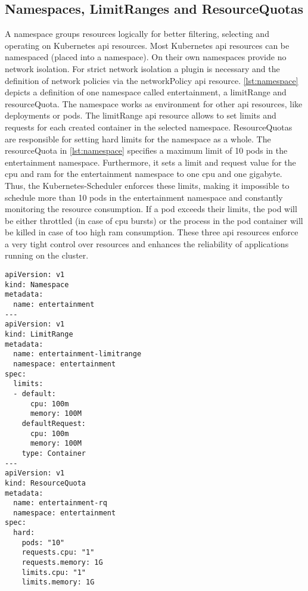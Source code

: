 \documentclass[titlepage]{report}
\begin{document}
\subsection{Namespaces, LimitRanges and ResourceQuotas}
A namespace groups resources logically for better filtering, selecting and operating on Kubernetes \gls{api} resources.
Most Kubernetes \gls{api} resources can be namespaced (placed into a namespace). On their own namespaces provide no network isolation.
For strict network isolation a  plugin is necessary and the definition of network policies via the networkPolicy \gls{api}
resource. \autoref{lst:namespace} depicts a definition of one namespace called entertainment, a limitRange and resourceQuota.
The namespace works as environment for other \gls{api} resources, like deployments or pods. The limitRange \gls{api} resource
allows to set limits and requests for each created container in the selected namespace. ResourceQuotas are responsible for
setting hard limits for the namespace as a whole. The resourceQuota in \autoref{lst:namespace} specifies a maximum limit
of 10 pods in the entertainment namespace. Furthermore, it sets a limit and request value for the \gls{cpu} and \gls{ram} for
the entertainment namespace to one \gls{cpu} and one gigabyte. Thus, the Kubernetes-Scheduler enforces these limits, making it impossible
to schedule more than 10 pods in the entertainment namespace and constantly monitoring the resource consumption. If a pod exceeds their
limits, the pod will be either throttled (in case of \gls{cpu} bursts) or the process in the pod container will be killed {in case of too high \gls{ram} consumption}.
These three \gls{api} resources enforce a very tight control over resources and enhances the reliability of applications running on the cluster.

\begin{minipage}{\linewidth}
\begin{lstlisting}[caption={Namespace definition for a namespace called entertainment with limitRange and ResourceQuota},label={lst:namespace}]
apiVersion: v1
kind: Namespace
metadata:
  name: entertainment
---
apiVersion: v1
kind: LimitRange
metadata:
  name: entertainment-limitrange
  namespace: entertainment
spec:
  limits:
  - default:
      cpu: 100m
      memory: 100M
    defaultRequest:
      cpu: 100m
      memory: 100M
    type: Container
---
apiVersion: v1
kind: ResourceQuota
metadata:
  name: entertainment-rq
  namespace: entertainment
spec:
  hard:
    pods: "10"
    requests.cpu: "1"
    requests.memory: 1G
    limits.cpu: "1"
    limits.memory: 1G
\end{lstlisting}
\end{minipage}
\end{document}

